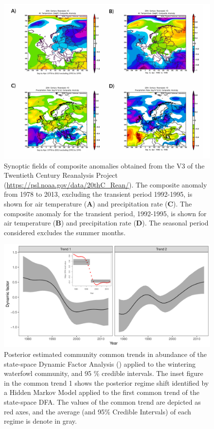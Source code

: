 \documentclass[12pt]{article}
\begin{document}
	\begin{figure}[t]
		\centering
		\includegraphics[width=\linewidth]{processed_figs/NOAA_CAR.pdf}
		\caption[Synoptic fields of composite anomalies obtained from the V3 of the Twentieth Century Reanalysis Project]{Synoptic fields of composite anomalies obtained from the V3 of the Twentieth Century Reanalysis Project (\url{https://psl.noaa.gov/data/20thC_Rean/}). The composite anomaly from 1978 to 2013, excluding the transient period 1992-1995, is shown for air temperature (\textbf{A}) and precipitation rate (\textbf{C}). The composite anomaly for the transient period, 1992-1995, is shown for air temperature (\textbf{B}) and precipitation rate (\textbf{D}). The seasonal period considered excludes the summer months. }
		\label{fig:CRP_NASA_V3}
	\end{figure}

	\begin{figure}[t]
		\centering
		\includegraphics[width=1\linewidth]{processed_figs/Common_Trends}
		\caption[Posterior estimated community common DFA trends]{Posterior estimated community common trends in abundance of the state-space Dynamic Factor Analysis (\cite{Ward2022}) applied to the wintering waterfowl community, and 95 \% credible intervals. The inset figure in the common trend 1 shows the posterior regime shift identified by a Hidden Markov Model applied to the first common trend of the state-space DFA. The values of the common trend are depicted as red axes, and the average (and 95\% Credible Intervals) of each regime is denote in gray.}
		\label{fig:Common_Trends}
	\end{figure}
\end{document}
